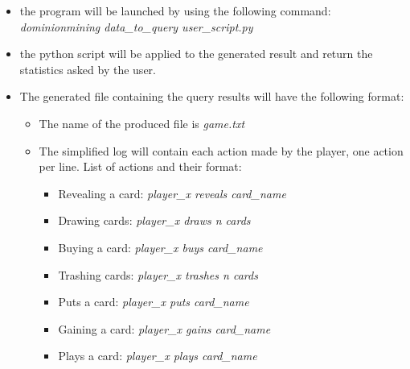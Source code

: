 \documentclass{scrreprt}
\begin{document}
\begin{itemize}
\item the program will be launched by using the following command: \textit{dominionmining data\_to\_query user\_script.py}
 \item the python script will be applied to the generated result and return the statistics asked by the user.
\item The generated file containing the query results will have the following format:
\begin{itemize}
\item The name of the produced file is \textit{game.txt}
\item The simplified log will contain each action made by the player, one action per line. List of actions and their format:
\begin{itemize}
\item Revealing a card: \textit{player\_x reveals card\_name}
\item Drawing cards: \textit{player\_x draws n cards}
\item Buying a card: \textit{player\_x buys card\_name}
\item Trashing cards: \textit{player\_x trashes n cards}
\item Puts a card: \textit{player\_x puts card\_name}
\item Gaining a card: \textit{player\_x gains card\_name}
\item Plays a card: \textit{player\_x plays card\_name}
\end{itemize}
\end{itemize}
\end{itemize}
\end{document}
